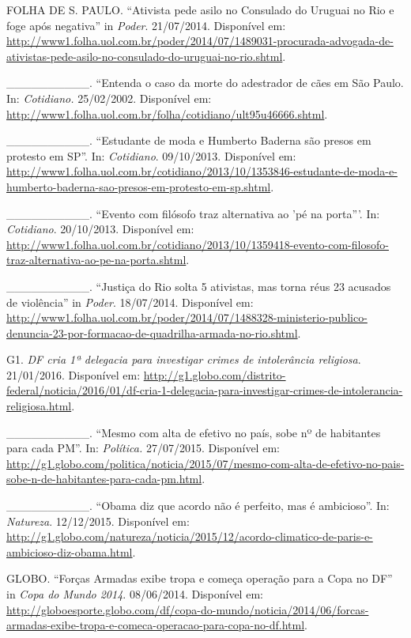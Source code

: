 FOLHA DE S. PAULO. ``Ativista pede asilo no Consulado do Uruguai no Rio
e foge após negativa'' in \emph{Poder}. 21/07/2014. Disponível em:
\url{http://www1.folha.uol.com.br/poder/2014/07/1489031-procurada-advogada-de-ativistas-pede-asilo-no-consulado-do-uruguai-no-rio.shtml}.

\_\_\_\_\_\_\_\_\_\_. ``Entenda o caso da morte do adestrador de cães em
São Paulo. In: \emph{Cotidiano.} 25/02/2002. Disponível em:
\url{http://www1.folha.uol.com.br/folha/cotidiano/ult95u46666.shtml}.

\_\_\_\_\_\_\_\_\_\_. ``Estudante de moda e Humberto Baderna são presos
em protesto em SP''. In: \emph{Cotidiano}. 09/10/2013. Disponível em:
\url{http://www1.folha.uol.com.br/cotidiano/2013/10/1353846-estudante-de-moda-e-humberto-baderna-sao-presos-em-protesto-em-sp.shtml}.

\_\_\_\_\_\_\_\_\_\_. ``Evento com filósofo traz alternativa ao 'pé na
porta'''. In: \emph{Cotidiano}. 20/10/2013. Disponível em:
\url{http://www1.folha.uol.com.br/cotidiano/2013/10/1359418-evento-com-filosofo-traz-alternativa-ao-pe-na-porta.shtml}.

\_\_\_\_\_\_\_\_\_\_. ``Justiça do Rio solta 5 ativistas, mas torna réus
23 acusados de violência'' in \emph{Poder}. 18/07/2014. Disponível em:
\url{http://www1.folha.uol.com.br/poder/2014/07/1488328-ministerio-publico-denuncia-23-por-formacao-de-quadrilha-armada-no-rio.shtml}.

G1. \emph{DF cria 1ª delegacia para investigar crimes de intolerância
religiosa}. 21/01/2016. Disponível em:
\url{http://g1.globo.com/distrito-federal/noticia/2016/01/df-cria-1-delegacia-para-investigar-crimes-de-intolerancia-religiosa.html}.

\_\_\_\_\_\_\_\_\_\_. ``Mesmo com alta de efetivo no país, sobe nº de
habitantes para cada PM''. In: \emph{Política.} 27/07/2015. Disponível
em:
\url{http://g1.globo.com/politica/noticia/2015/07/mesmo-com-alta-de-efetivo-no-pais-sobe-n-de-habitantes-para-cada-pm.html}.

\_\_\_\_\_\_\_\_\_\_. ``Obama diz que acordo não é perfeito, mas é
ambicioso''. In: \emph{Natureza}. 12/12/2015. Disponível em:
\url{http://g1.globo.com/natureza/noticia/2015/12/acordo-climatico-de-paris-e-ambicioso-diz-obama.html}.

GLOBO. ``Forças Armadas exibe tropa e começa operação para a Copa no
DF'' in \emph{Copa do Mundo 2014}. 08/06/2014. Disponível em:
\url{http://globoesporte.globo.com/df/copa-do-mundo/noticia/2014/06/forcas-armadas-exibe-tropa-e-comeca-operacao-para-copa-no-df.html}.

